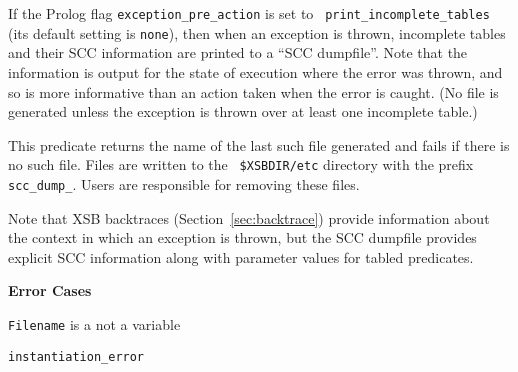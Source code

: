 \begin{description}
{%
%
%
}
%
If the Prolog flag {\tt exception\_pre\_action} is set to {\tt
  print\_incomplete\_tables} (its default setting is {\tt none}), then
when an exception is thrown, incomplete tables and their SCC
information are printed to a ``SCC dumpfile''.  Note that the
information is output for the state of execution where the error was
thrown, and so is more informative than an action taken when the error
is caught.  (No file is generated unless the exception is thrown over
at least one incomplete table.)

This predicate returns the name of the last such file generated and
fails if there is no such file.  Files are written to the {\tt
  \$XSBDIR/etc} directory with the prefix {\tt scc\_dump\_}.  Users
are responsible for removing these files.

Note that XSB backtraces (Section~\ref{sec:backtrace}) provide
information about the context in which an exception is thrown, but the
SCC dumpfile provides explicit SCC information along with parameter
values for tabled predicates.

{\bf Error Cases}
\bi
\item {\tt Filename} is a not a variable
\bi
\item {\tt instantiation\_error}
\ei
\ei


\end{description}
